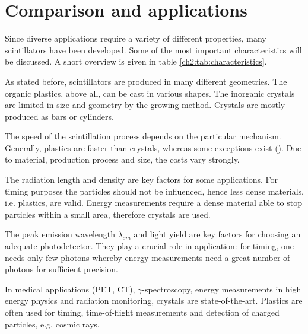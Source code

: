 \section{Comparison and applications}
Since diverse applications require a variety of different properties, many scintillators have been developed. Some of the most important characteristics will be discussed. A short overview is given in table \ref{ch2:tab:characteristics}. \par 
As stated before, scintillators are produced in many different geometries. The organic plastics, above all, can be cast in various shapes. The inorganic crystals are limited in size and geometry by the growing method. Crystals are mostly produced as bars or cylinders. \par  
The speed of the scintillation process depends on the particular mechanism. Generally, plastics are faster than crystals, whereas some exceptions exist (\baf). Due to material, production process and size, the costs vary strongly. \par 
The radiation length and density are key factors for some applications. For timing purposes the particles should not be influenced, hence less dense materials, i.e. plastics, are valid. Energy measurements require a dense material able to stop particles within a small area, therefore crystals are used. \par 
The peak emission wavelength $\lambda_{em}$ and light yield are key factors for choosing an adequate photodetector. They play a crucial role in application: for timing, one needs only few photons whereby energy measurements need a great number of photons for sufficient precision. \par 
In medical applications (PET, CT), $\gamma$-spectroscopy, energy measurements in high energy physics and radiation monitoring, crystals are state-of-the-art. Plastics are often used for timing, time-of-flight measurements and detection of charged particles, e.g. cosmic rays.

